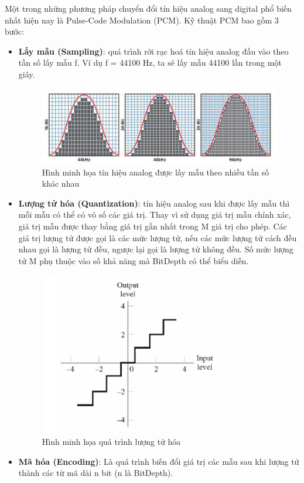 Một trong những phương pháp chuyển đổi tín hiệu analog sang digital phổ biến nhất hiện nay là Pulse-Code Modulation (PCM).
Kỹ thuật PCM bao gồm 3 bước:
\begin{itemize}
	\item \textbf{Lấy mẫu (Sampling)}: quá trình rời rạc hoá tín hiệu analog đầu vào theo tần số lấy mẫu f. Ví dụ f = 44100 Hz, ta sẽ lấy mẫu 44100 lần trong một giây.
	\begin{figure}[h]
		\centering
		\includegraphics[scale=1]{sampling}
		\caption{Hình minh họa tín hiệu analog được lấy mẫu theo nhiều tần số khác nhau}
		\label{fig:c2_sampling}
	\end{figure}
	\item \textbf{Lượng tử hóa (Quantization)}: tín hiệu analog sau khi được lấy mẫu thì mỗi mẫu có thể có vô số các giá trị. Thay vì sử dụng giá trị mẫu chính xác, giá trị mẫu được thay bằng giá trị gần nhất trong M giá trị cho phép. Các giá trị lượng tử được gọi là các mức lượng tử, nếu các mức lượng tử cách đều nhau gọi là lượng tử đều, ngược lại gọi là lượng tử không đều. Số mức lượng tử M phụ thuộc vào số khả năng mà BitDepth có thể biểu diễn.
	\begin{figure}[h]
		\centering
		\includegraphics[scale=1]{quantization}
		\caption{Hình minh họa quá trình lượng tử hóa}
		\label{fig:c2_quantization}
	\end{figure}
	\item \textbf{Mã hóa (Encoding)}: Là quá trình biến đổi giá trị các mẫu sau khi lượng tử thành các từ mã dài n bit (n là BitDepth).
\end{itemize}

